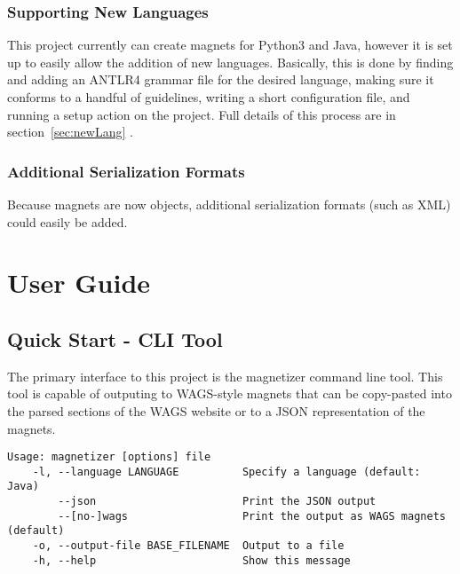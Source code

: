 \documentclass[letter,10pt]{article}
\begin{document}
\subsubsection{Supporting New Languages}

This project currently can create magnets for Python3 and Java, however 
it is set up to easily allow the addition of new languages. 
Basically, this is done by finding and adding an ANTLR4 grammar file 
for the desired language, making sure it conforms to a handful of 
guidelines, writing a short configuration file, and running a setup 
action on the project. Full details of this process are in 
section~\ref{sec:newLang} .


\subsubsection{Additional Serialization Formats}

Because magnets are now objects, additional serialization formats (such 
as XML) could easily be added. 



\section{User Guide}

\subsection{Quick Start - CLI Tool}

The primary interface to this project is the magnetizer command line 
tool. This tool is capable of outputing to WAGS-style magnets that can 
be copy-pasted into the parsed sections of the WAGS website or to a 
JSON representation of the magnets.

\begin{verbatim}
Usage: magnetizer [options] file
    -l, --language LANGUAGE          Specify a language (default: Java)
        --json                       Print the JSON output
        --[no-]wags                  Print the output as WAGS magnets 
(default)
    -o, --output-file BASE_FILENAME  Output to a file
    -h, --help                       Show this message
\end{verbatim}


\end{document}

